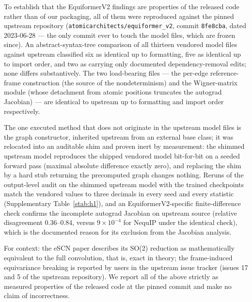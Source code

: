 To establish that the EquiformerV2 findings are properties of the released code rather than of our packaging, all of them were reproduced against the pinned upstream repository (\texttt{atomicarchitects/equiformer\_v2}, commit \texttt{8fe8cba}, dated 2023-06-28 --- the only commit ever to touch the model files, which are frozen since). An abstract-syntax-tree comparison of all thirteen vendored model files against upstream classified six as identical up to formatting, five as identical up to import order, and two as carrying only documented dependency-removal edits; none differs substantively. The two load-bearing files --- the per-edge reference-frame construction (the source of the nondeterminism) and the Wigner-matrix module (whose detachment from atomic positions truncates the autograd Jacobian) --- are identical to upstream up to formatting and import order respectively.

The one executed method that does not originate in the upstream model files is the graph constructor, inherited upstream from an external base class; it was relocated into an auditable shim and proven inert by measurement: the shimmed upstream model reproduces the shipped vendored model bit-for-bit on a seeded forward pass (maximal absolute difference exactly zero), and replacing the shim by a hard stub returning the precomputed graph changes nothing. Reruns of the output-level audit on the shimmed upstream model with the trained checkpoints match the vendored values to three decimals in every seed and every statistic (Supplementary Table~\ref{stab:h1}), and an EquiformerV2-specific finite-difference check confirms the incomplete autograd Jacobian on upstream source (relative disagreement 0.36--0.84, versus $9\times10^{-4}$ for NequIP under the identical check), which is the documented reason for its exclusion from the Jacobian analysis.

For context: the eSCN paper describes its SO(2) reduction as mathematically equivalent to the full convolution, that is, exact in theory; the frame-induced equivariance breaking is reported by users in the upstream issue tracker (issues 17 and 5 of the upstream repository). We report all of the above strictly as measured properties of the released code at the pinned commit and make no claim of incorrectness.

